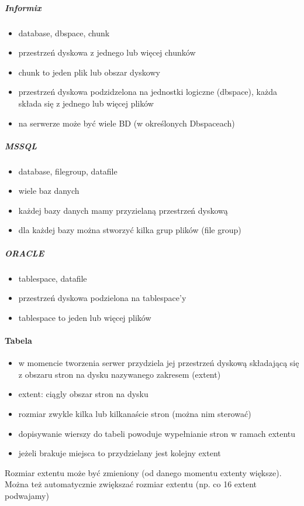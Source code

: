 \documentclass[12pt]{article}
\begin{document}
\subparagraph{Informix}
\begin{itemize}
\item database, dbspace, chunk
\item przestrzeń dyskowa z jednego lub więcej chunków
\item chunk to jeden plik lub obszar dyskowy
\item przestrzeń dyskowa podzidzelona na jednostki logiczne (dbspace), każda
     składa się z jednego lub więcej plików
\item na serwerze może być wiele BD (w określonych Dbspaceach)
\end{itemize}

\subparagraph{MSSQL}
\begin{itemize}
\item database, filegroup, datafile
\item wiele baz danych
\item każdej bazy danych mamy przyzielaną przestrzeń dyskową
\item dla każdej bazy można stworzyć kilka grup plików (file group)
\end{itemize}

\subparagraph{ORACLE}
\begin{itemize}
\item tablespace, datafile
\item przestrzeń dyskowa podzielona na tablespace'y
\item tablespace to jeden lub więcej plików
\end{itemize}

\paragraph{Tabela}
\begin{itemize}
\item w momencie tworzenia serwer przydziela jej przestrzeń dyskową składającą
   się z obszaru stron na dysku nazywanego zakresem (extent)
\item extent: ciągly obszar stron na dysku
\item rozmiar zwykle kilka lub kilkanaście stron (można nim sterować)
\item dopisywanie wierszy do tabeli powoduje wypełnianie stron w ramach extentu
\item jeżeli brakuje miejsca to przydzielany jest kolejny extent
\end{itemize}

Rozmiar extentu może być zmieniony (od danego momentu extenty większe). Można
też automatycznie zwiększać rozmiar extentu (np. co 16 extent podwajamy)
\end{document}

